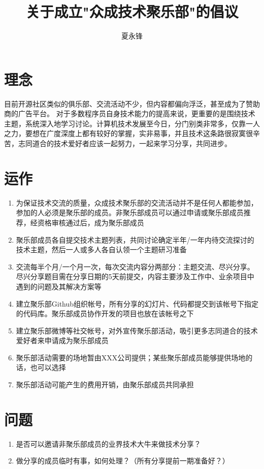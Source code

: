 \documentclass[12pt]{article}
\begin{document}
\begin{CJK*}{UTF8}{gkai}

\title{\color{blue}关于成立"众成技术聚乐部"的倡议}
\author{夏永锋}
\date{}
\maketitle

\newpage
\section*{理念}
目前开源社区类似的俱乐部、交流活动不少，但内容都偏向浮泛，甚至成为了赞助商的广告平台。
对于多数程序员自身技术能力的提高来说，更重要的是围绕技术主题，系统深入地学习讨论。计算机技术发展至今日，分门别类非常多，仅靠一人之力，要想在广度深度上都有较好的掌握，实非易事，并且技术这条路很寂寞很辛苦，志同道合的技术爱好者应该一起努力，一起来学习分享，共同进步。

\section*{运作}
\begin{enumerate}
\item 为保证技术交流的质量，众成技术聚乐部的交流活动并不是任何人都能参加，参加的人必须是聚乐部的成员。非聚乐部成员可以通过申请或聚乐部成员推荐，经资格审核通过后，成为聚乐部成员
\item 聚乐部成员各自提交技术主题列表，共同讨论确定半年/一年内待交流探讨的技术主题，然后一人或多人各自认领一个主题研习准备
\item 交流每半个月/一个月一次，每次交流内容分两部分：主题交流、尽兴分享。尽兴分享题目需在分享日期的5天前提交，内容主要涉及工作中、业余项目中遇到的问题及其解决方案等
\item 建立聚乐部Github组织帐号，所有分享的幻灯片、代码都提交到该帐号下指定的代码库。聚乐部成员协作开发的项目也放在该帐号之下
\item 建立聚乐部微博等社交帐号，对外宣传聚乐部活动，吸引更多志同道合的技术爱好者来申请成为聚乐部成员
\item 聚乐部活动需要的场地暂由XXX公司提供；某些聚乐部成员能够提供场地的话，也可以选择
\item 聚乐部活动可能产生的费用开销，由聚乐部成员共同承担
\end{enumerate}

\section*{问题}
\begin{enumerate}
\item 是否可以邀请非聚乐部成员的业界技术大牛来做技术分享？
\item 做分享的成员临时有事，如何处理？（所有分享提前一期准备好？）
\end{enumerate}

\end{CJK*}
\end{document}
